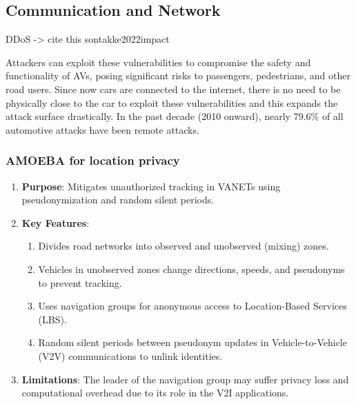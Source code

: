\subsection{Communication and Network}\label{subsec:v2x-communication-and-network}

DDoS -> cite this sontakke2022impact

Attackers can exploit these vulnerabilities to compromise the safety and functionality of AVs, posing significant risks to passengers, pedestrians, and other road users.
Since now cars are connected to the internet, there is no need to be physically close to the car to exploit these vulnerabilities and this expands the attack surface drastically.
In the past decade (2010 onward), nearly 79.6\% of all automotive attacks have been
remote attacks\cite{cybersec}.

\subsubsection{AMOEBA for location privacy}
\begin{enumerate}
    \item \textbf{Purpose}: Mitigates unauthorized tracking in VANETs using pseudonymization and random silent periods.
    \item \textbf{Key Features}:
    \begin{enumerate}
        \item Divides road networks into observed and unobserved (mixing) zones.
        \item Vehicles in unobserved zones change directions, speeds, and pseudonyms to prevent tracking.
        \item Uses navigation groups for anonymous access to Location-Based Services (LBS).
        \item Random silent periods between pseudonym updates in Vehicle-to-Vehicle (V2V) communications to unlink identities.
    \end{enumerate}
    \item \textbf{Limitations}: The leader of the navigation group may suffer privacy loss and computational overhead due to its role in the V2I applications.
\end{enumerate}

